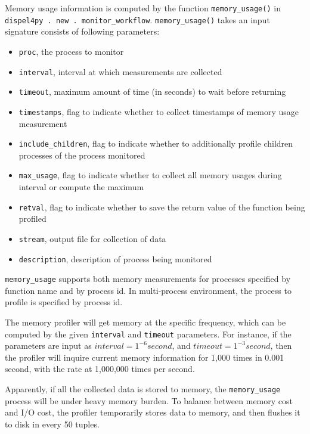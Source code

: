 \documentclass[10pt,twoside,openright,logo]{report}
\begin{document}
Memory usage information is computed by the function \texttt{memory_usage()} in \texttt{dispel4py . new . monitor_workflow}. \texttt{memory_usage()} takes an input signature consists of following parameters:
    \begin{itemize}
        \item \texttt{proc}, the process to monitor
        \item \texttt{interval}, interval at which measurements are collected
        \item \texttt{timeout}, maximum amount of time (in seconds) to wait before returning
        \item \texttt{timestamps}, flag to indicate whether to collect timestamps of memory usage measurement
        \item \texttt{include_children}, flag to indicate whether to additionally profile children processes of the process monitored
        \item \texttt{max_usage}, flag to indicate whether to collect all memory usages during interval or compute the maximum
        \item \texttt{retval}, flag to indicate whether to save the return value of the function being profiled
        \item \texttt{stream}, output file for collection of data
        \item \texttt{description}, description of process being monitored
    \end{itemize}
\texttt{memory_usage} supports both memory measurements for processes specified by function name and by process id. In multi-process environment, the process to profile is specified by process id.

The memory profiler will get memory at the specific frequency, which can be computed by the given \texttt{interval} and \texttt{timeout} parameters. For instance, if the parameters are input as $interval = 1^{-6} second$, and $timeout = 1^{-3} second$, then the profiler will inquire current memory information for 1,000 times in 0.001 second, with the rate at 1,000,000 times per second.

Apparently, if all the collected data is stored to memory, the \texttt{memory_usage} process will be under heavy memory burden. To balance between memory cost and I/O cost, the profiler temporarily stores data to memory, and then flushes it to disk in every 50 tuples.
\end{document}
